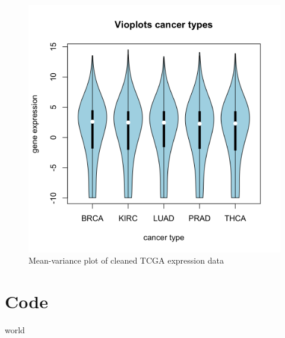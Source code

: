 \documentclass[
  parskip,
  oneside]{scrreprt}
\begin{document}
\begin{figure}

{\centering \includegraphics[width=0.3\linewidth]{figures/Vioplots cancer types} 

}

\caption{Mean-variance plot of cleaned TCGA expression data}\label{fig:showviolinplots}
\end{figure}

\hypertarget{code}{%
\section{Code}\label{code}}

world
\end{document}
